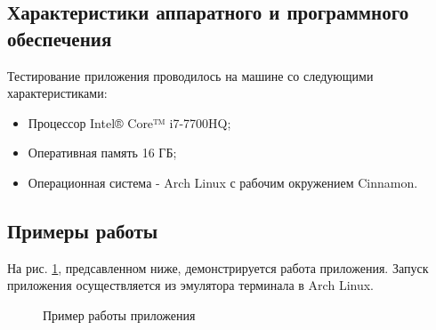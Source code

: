 \documentclass[a4paper,12pt]{article}
\begin{document}
\subsection{Характеристики аппаратного и программного обеспечения}
Тестирование приложения проводилось на машине со следующими характеристиками:\\
\begin{itemize}
\item Процессор Intel® Core™ i7-7700HQ;
\item Оперативная память 16 ГБ;
\item Операционная система - Arch Linux с рабочим окружением Cinnamon.
\end{itemize}

\newpage
\subsection{Примеры работы}
На рис. \ref{images:example}, предсавленном ниже, демонстрируется работа приложения. Запуск приложения осуществляется из эмулятора терминала в Arch Linux.
\begin{figure}[h]
\caption{Пример работы приложения}
\label{images:example}
\end{figure}
\end{document}
